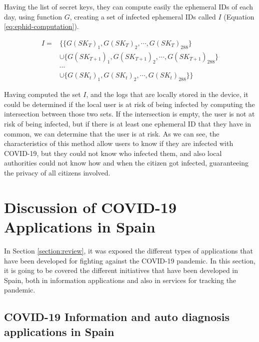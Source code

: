 \documentclass[a4paper, 12pt]{article}
\begin{document}
Having the list of secret keys, they can compute easily the ephemeral IDs of each day, using function $G$, creating a set of infected ephemeral IDs called $I$ (Equation \ref{eq:ephid-computation}).

\begin{equation}
\begin{aligned}
I ={} & \{\{G(SK_T)_1, G(SK_T)_2, \cdots, G(SK_T)_{288}\} \\
      & \cup \{G(SK_{T+1})_1, G(SK_{T+1})_2, \cdots, G(SK_{T+1})_{288}\} \\
      & \cdots \\
      & \cup \{G(SK_t)_1, G(SK_t)_2, \cdots, G(SK_t)_{288}\}\}
\end{aligned}
\label{eq:ephid-computation}
\end{equation}

Having computed the set $I$, and the logs that are locally stored in the device, it could be determined if the local user is at risk of being infected by computing the intersection between those two sets. If the intersection is empty, the user is not at risk of being infected, but if there is at least one ephemeral ID that they have in common, we can determine that the user is at risk. As we can see, the characteristics of this method allow users to know if they are infected with COVID-19, but they could not know who infected them, and also local authorities could not know how and when the citizen got infected, guaranteeing the privacy of all citizens involved.


\section{Discussion of COVID-19 Applications in Spain}
\label{section:discussion}

In Section \ref{section:review}, it was exposed the different types of applications that have been developed for fighting against the COVID-19 pandemic. In this section, it is going to be covered the different initiatives that have been developed in Spain, both in information applications and also in services for tracking the pandemic.

\subsection{COVID-19 Information and auto diagnosis applications in Spain}
\label{sec:information-apps-spain}
\end{document}
